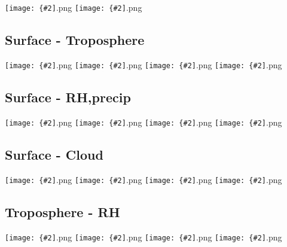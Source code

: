 \documentclass[12pt,a4paper]{article}
\newcommand{\pngfig}[2][0.5]{\texttt{[image: \{\#2]}.png}}
\begin{document}
\section{}

\pngfig[0.5]{phi_trop_4ysl}
\pngfig[0.5]{phi_rcm_4ysl}

\subsection{Surface - Troposphere}
\pngfig[0.5]{reg_T_sfc_T_tropo}
\pngfig[0.5]{reg_T_sfc_RH_tropo}
\pngfig[0.5]{cor_T_sfc_T_tropo}
\pngfig[0.5]{cor_T_sfc_RH_tropo}
\subsection{Surface - RH,precip}
\pngfig[0.5]{reg_T_sfc_RH_sfc}
\pngfig[0.5]{reg_T_sfc_Precip}
\pngfig[0.5]{cor_T_sfc_RH_sfc}
\pngfig[0.5]{cor_T_sfc_Precip}
\subsection{Surface - Cloud}
\pngfig[0.5]{reg_T_sfc_Cld_High}
\pngfig[0.5]{reg_T_sfc_Cld_Low}
\pngfig[0.5]{cor_T_sfc_Cld_High}
\pngfig[0.5]{cor_T_sfc_Cld_Low}
\subsection{Troposphere - RH}
\pngfig[0.5]{reg_T_tropo_RH_sfc}
\pngfig[0.5]{reg_T_tropo_RH_tropo}
\pngfig[0.5]{cor_T_tropo_RH_sfc}
\pngfig[0.5]{cor_T_tropo_RH_tropo}
\end{document}

